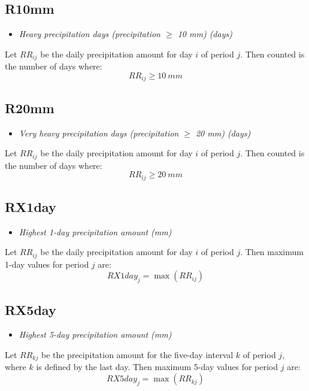 \documentclass[a4paper,11pt]{article}
\begin{document}
\subsection*{R10mm}
\begin{itemize}
\item \textit{Heavy precipitation days (precipitation $\geq$ 10 mm) (days)}
\end{itemize}
Let $RR_{ij}$ be the daily precipitation amount for day $i$ of period
$j$. Then counted is the number of days where:
\begin{equation*}
RR_{ij} \geq 10~mm
\end{equation*}

\subsection*{R20mm}
\begin{itemize}
\item \textit{Very heavy precipitation days (precipitation $\geq$ 20
mm) (days)}
\end{itemize}
Let $RR_{ij}$ be the daily precipitation amount for day $i$ of period
$j$. Then counted is the number of days where:
\begin{equation*}
RR_{ij} \geq 20~mm
\end{equation*}

\subsection*{RX1day}
\begin{itemize}
\item \textit{Highest 1-day precipitation amount (mm)}
\end{itemize}
Let $RR_{ij}$ be the daily precipitation amount for day $i$ of period
$j$. Then maximum 1-day values for period $j$ are:
\begin{equation*}
RX1day_{j} = \max{(RR_{ij})}
\end{equation*}

\subsection*{RX5day}
\begin{itemize}
\item \textit{Highest 5-day precipitation amount (mm)}
\end{itemize}
Let $RR_{kj}$ be the precipitation amount for the five-day interval
$k$ of period $j$, where $k$ is defined by the last day. Then maximum
5-day values for period $j$ are:
\begin{equation*}
RX5day_{j} = \max{(RR_{kj})}
\end{equation*}
\end{document}
